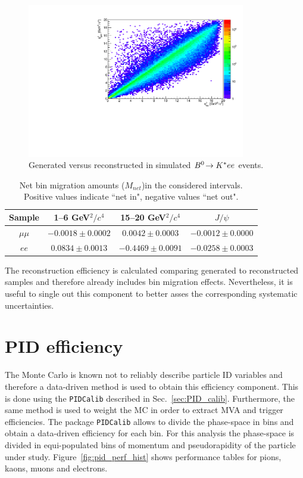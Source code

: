 \begin{figure}[h!]
\centering
\includegraphics[width=0.85\textwidth]{RKst/figs/bin_mig.pdf}
\caption{Generated versus reconstructed \qsq in simulated ${{B}^0}\!\rightarrow {\ensuremath{{K}^*}} ee$ events.}
\label{fig:ee_bin_mig}
\end{figure}

\begin{table}[bh]
\centering
\caption{Net bin migration amounts ($M_{net}$)in the considered \qsq intervals.
Positive values indicate ``net in", negative values ``net out".}
\begin{tabular}{|c|c|c|c|}
\hline
 Sample 			& 1--6 GeV$^2/c^4$ 				& 15--20 GeV$^2/c^4$ 				& $J/\psi$  \\ \hline
$\mu\mu$ 	& $ -0.0018  \pm  0.0002 $ & $ 0.0042  \pm  0.0003 $ & $ -0.0012  \pm  0.0000 $ \\
$ee$ 	& $ 0.0834  \pm  0.0013 $ & $ -0.4469  \pm  0.0091 $ & $ -0.0258  \pm  0.0003 $ \\
\hline 
 \end{tabular}
 \label{tab:bin_mig}
\end{table}

The reconstruction efficiency is calculated comparing generated to reconstructed samples
and therefore already includes bin migration effects. Nevertheless, it is useful to single
out this component to better asses the corresponding systematic uncertainties.



\section{PID efficiency}
\label{sec:RKst_pid_eff}

The Monte Carlo is known not to reliably describe particle ID variables
and therefore a data-driven method is used to obtain this efficiency component.
This is done using the \verb!PIDCalib! described in Sec.~\ref{sec:PID_calib}.
Furthermore, the same method is used to weight the MC in order to extract MVA
and trigger efficiencies.
The package \verb!PIDCalib!  allows to divide the phase-space in bins and obtain a data-driven
efficiency for each bin. For this analysis the phase-space is divided in equi-populated bins of momentum
and pseudorapidity of the particle under study. Figure~\ref{fig:pid_perf_hist} shows performance
tables for pions, kaons, muons and electrons.


